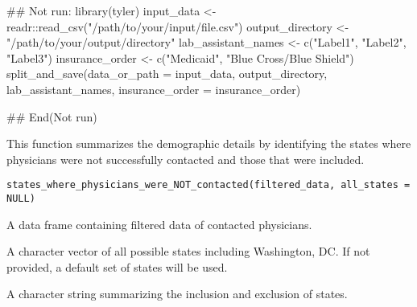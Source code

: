 \documentclass[a4paper]{book}
\begin{document}
%
\begin{Examples}
\begin{ExampleCode}
## Not run: 
library(tyler)
input_data <- readr::read_csv("/path/to/your/input/file.csv")
output_directory <- "/path/to/your/output/directory"
lab_assistant_names <- c("Label1", "Label2", "Label3")
insurance_order <- c("Medicaid", "Blue Cross/Blue Shield")
split_and_save(data_or_path = input_data, output_directory, lab_assistant_names, insurance_order = insurance_order)

## End(Not run)
\end{ExampleCode}
\end{Examples}
%
\begin{Description}
This function summarizes the demographic details by identifying the states where physicians
were not successfully contacted and those that were included.
\end{Description}
%
\begin{Usage}
\begin{verbatim}
states_where_physicians_were_NOT_contacted(filtered_data, all_states = NULL)
\end{verbatim}
\end{Usage}
%
\begin{Arguments}
\begin{ldescription}
\item[\code{filtered\_data}] A data frame containing filtered data of contacted physicians.

\item[\code{all\_states}] A character vector of all possible states including Washington, DC.
If not provided, a default set of states will be used.
\end{ldescription}
\end{Arguments}
%
\begin{Value}
A character string summarizing the inclusion and exclusion of states.
\end{Value}
%
\end{document}
